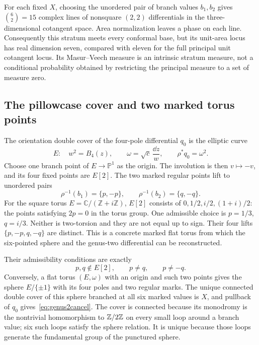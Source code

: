 For each fixed $X$, choosing the unordered pair of branch values
$b_1,b_2$ gives $\binom62=15$ complex lines of nonsquare
$(2,2)$ differentials in the three-dimensional cotangent space.
Area normalization leaves a phase on each line.  Consequently this
stratum meets every conformal base, but its unit-area locus has
real dimension seven, compared with eleven for the full principal
unit cotangent locus.  Its Masur--Veech measure is an intrinsic
stratum measure, not a conditional probability obtained by
restricting the principal measure to a set of measure zero.

\subsection{The pillowcase cover and two marked torus points}
\label{subsec:genus2ellipticcover}

The orientation double cover of the four-pole differential $q_0$
is the elliptic curve
\begin{equation}
 E:\quad w^2=B_4(z),
 \qquad \omega=\sqrt c\,\frac{\dd z}{w},
 \qquad \rho^*q_0=\omega^2.
 \label{eq:genus2toruscover}
\end{equation}
Choose one branch point of $E\to\mathbb P^1$ as the origin.
The involution is then $v\mapsto-v$, and its four fixed points are
$E[2]$.  The two marked regular points lift to unordered pairs
\[
 \rho^{-1}(b_1)=\{p,-p\},\qquad
 \rho^{-1}(b_2)=\{q,-q\}.
\]
For the square torus $E=\mathbb C/(\mathbb Z+i\mathbb Z)$,
$E[2]$ consists of $0,1/2,i/2,(1+i)/2$: the points satisfying
$2p=0$ in the torus group. One admissible choice is
$p=1/3$, $q=i/3$. Neither is two-torsion and they are not equal
up to sign. Their four lifts $\{p,-p,q,-q\}$ are distinct.
This is a concrete marked flat torus from which the six-pointed
sphere and the genus-two differential can be reconstructed.

Their admissibility conditions are exactly
\begin{equation}
 p,q\notin E[2],\qquad p\ne q,\qquad p\ne -q.
 \label{eq:genus2torusadmissible}
\end{equation}
Conversely, a flat torus $(E,\omega)$ with an origin and such two
points gives the sphere $E/\{\pm1\}$ with its four poles and two
regular marks.  The unique connected double cover of this sphere
branched at all six marked values is $X$, and pullback of $q_0$
gives~\eqref{eq:genus2cancel}.
The cover is connected because its monodromy is the nontrivial
homomorphism to $\mathbb Z/2\mathbb Z$ on every small loop around a branch
value; six such loops satisfy the sphere relation.  It is unique
because those loops generate the fundamental group of the
punctured sphere.


